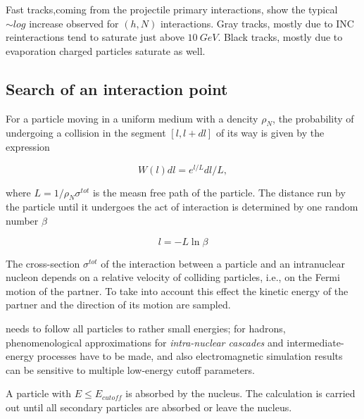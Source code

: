 Fast tracks,coming from the projectile primary interactions, show the typical $\sim log$ increase observed for $(h, N)$ interactions. 
Gray tracks, mostly due to INC reinteractions tend to saturate just above $10~GeV$.
Black tracks, mostly due to evaporation charged particles saturate as well.

\subsection{Search of an interaction point}

For a particle moving in a uniform medium with a dencity $\rho_N$, the probability of undergoing a collision in the segment $[l, l + dl]$ of its way is given by the expression

\begin{equation}
W(l) dl = e^{l/L} dl/L,
\end{equation}

where $L= 1/\rho_N \sigma^{tot}$ is the measn free path of the particle.
The distance run by the particle 
until it undergoes the act of interaction 
is determined by one random number $\beta$


\begin{equation}
l = - L \ln \beta
\end{equation}

The cross-section $\sigma^{tot}$ of the interaction 
between a particle and an intranuclear nucleon 
depends on a relative velocity of colliding particles, 
i.e., on the Fermi motion of the partner.
To take into account this effect the kinetic energy of the partner 
and the direction of its motion are sampled. 


%

needs to follow all particles to rather small energies; for hadrons,
phenomenological approximations for {\it intra-nuclear cascades}
    and intermediate-energy processes have to be made, and also
    electromagnetic simulation results can be sensitive to multiple
    low-energy cutoff parameters. 

A particle with $E \le E_{cutoff}$ is absorbed by the nucleus. 
The calculation is carried out until all secondary particles are absorbed or leave the nucleus.

